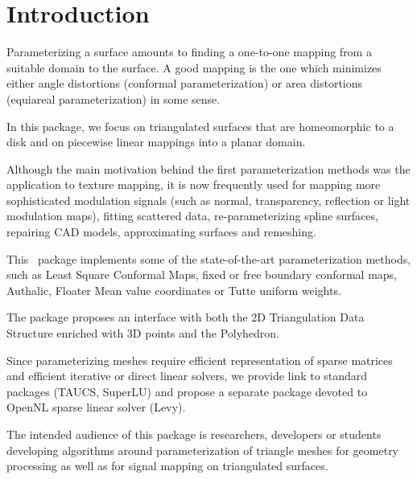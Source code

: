 \section{Introduction}

Parameterizing a surface amounts to finding a one-to-one mapping from
a suitable domain to the surface. A good mapping is the one which
minimizes either angle distortions (conformal parameterization) or
area distortions (equiareal parameterization) in some sense.

In this package, we focus on triangulated surfaces that are homeomorphic to a
disk and on piecewise linear mappings into a planar domain.

Although
the main motivation behind the first parameterization methods was the
application to texture mapping, it is now frequently used for mapping
more sophisticated modulation signals (such as normal, transparency,
reflection or light modulation maps), fitting scattered data,
re-parameterizing spline surfaces, repairing CAD models, approximating
surfaces and remeshing.

This \cgal\ package implements some of
the state-of-the-art parameterization methods, such as
Least Square Conformal Maps, fixed or free boundary conformal maps,
Authalic, Floater Mean value coordinates or Tutte uniform weights.

The package proposes
an interface with both the 2D Triangulation Data Structure enriched
with 3D points and the Polyhedron.

Since parameterizing meshes require
efficient representation of sparse matrices and efficient iterative or
direct linear solvers, we provide link to standard packages (TAUCS, SuperLU)
and propose a separate package devoted to OpenNL sparse linear solver (Levy).

The intended audience of this package is researchers, developers or
students developing algorithms around parameterization of triangle
meshes for geometry processing as well as for signal mapping on
triangulated surfaces.

